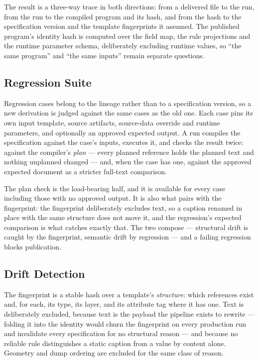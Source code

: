 The result is a three-way trace in both directions: from a delivered file to the run, from the
run to the compiled program and its hash, and from the hash to the specification version and the
template fingerprints it assumed. The published program's identity hash is computed over the
field map, the rule projections and the runtime parameter schema, deliberately excluding runtime
values, so ``the same program'' and ``the same inputs'' remain separate questions.

\subsection{Regression Suite}
\label{sec:design:regression}

Regression cases belong to the lineage rather than to a specification version, so a new
derivation is judged against the same cases as the old one. Each case pins its own input
template, source artifacts, source-data override and runtime parameters, and optionally an
approved expected output. A run compiles the specification against the case's inputs, executes
it, and checks the result twice: against the compiler's \emph{plan} --- every planned reference
holds the planned text and nothing unplanned changed --- and, when the case has one, against the
approved expected document as a stricter full-text comparison.

The plan check is the load-bearing half, and it is available for every case including those with
no approved output. It is also what pairs with the fingerprint: the fingerprint deliberately
excludes text, so a caption renamed in place with the same structure does not move it, and the
regression's expected comparison is what catches exactly that. The two compose --- structural
drift is caught by the fingerprint, semantic drift by regression --- and a failing regression
blocks publication.

\subsection{Drift Detection}
\label{sec:design:drift}

The fingerprint is a stable hash over a template's \emph{structure}: which references exist and,
for each, its type, its layer, and its attribute tag where it has one. Text is deliberately
excluded, because text is the payload the pipeline exists to rewrite --- folding it into the
identity would churn the fingerprint on every production run and invalidate every specification
for no structural reason --- and because no reliable rule distinguishes a static caption from a
value by content alone. Geometry and dump ordering are excluded for the same class of reason.

